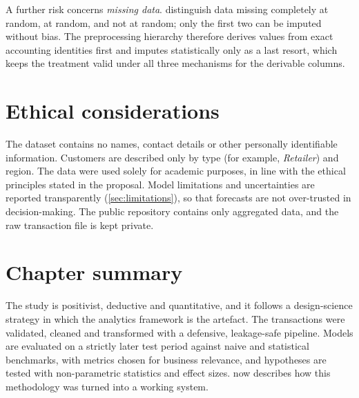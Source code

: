 A further risk concerns \emph{missing data}. \citet{little2019} distinguish data missing completely at random,
at random, and not at random; only the first two can be imputed without bias. The preprocessing hierarchy
therefore derives values from exact accounting identities first and imputes statistically only as a last
resort, which keeps the treatment valid under all three mechanisms for the derivable columns.

\section{Ethical considerations}
The dataset contains no names, contact details or other personally identifiable information. Customers are
described only by type (for example, \emph{Retailer}) and region. The data were used solely for academic
purposes, in line with the ethical principles stated in the proposal. Model limitations and uncertainties are
reported transparently (\cref{sec:limitations}), so that forecasts are not over-trusted in decision-making.
The public repository contains only aggregated data, and the raw transaction file is kept private.

\section{Chapter summary}
The study is positivist, deductive and quantitative, and it follows a design-science strategy in which the
analytics framework is the artefact. The \NRows transactions were validated, cleaned and transformed with a
defensive, leakage-safe pipeline. Models are evaluated on a strictly later test period against naive and
statistical benchmarks, with metrics chosen for business relevance, and hypotheses are tested with
non-parametric statistics and effect sizes.  now describes how this methodology was turned into
a working system.

